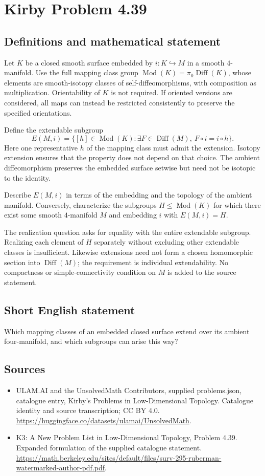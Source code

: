 \documentclass[11pt,a4paper]{article}
\begin{document}
\section*{Kirby Problem 4.39}\label{statement}

\subsection{Definitions and mathematical statement}
Let $K$ be a closed smooth surface embedded by $i:K\hookrightarrow M$
in a smooth $4$-manifold. Use the full mapping class group
$\operatorname{Mod}(K)=\pi_0\operatorname{Diff}(K)$, whose elements
are smooth-isotopy classes of self-diffeomorphisms, with composition
as multiplication. Orientability of $K$ is not required. If oriented
versions are considered, all maps can instead be restricted consistently
to preserve the specified orientations.

Define the extendable subgroup
\[
 E(M,i)=\{[h]\in\operatorname{Mod}(K):
    \exists F\in\operatorname{Diff}(M),\ F\circ i=i\circ h\}.
\]
Here one representative $h$ of the mapping class must admit the
extension. Isotopy extension ensures that the property does not depend
on that choice. The ambient diffeomorphism preserves the embedded
surface setwise but need not be isotopic to the identity.

Describe $E(M,i)$ in terms of the embedding and the topology of the
ambient manifold. Conversely, characterize the subgroups
$H\le\operatorname{Mod}(K)$ for which there exist some smooth
$4$-manifold $M$ and embedding $i$ with $E(M,i)=H$.

The realization question asks for equality with the entire extendable
subgroup. Realizing each element of $H$ separately without excluding
other extendable classes is insufficient. Likewise extensions need
not form a chosen homomorphic section into $\operatorname{Diff}(M)$;
the requirement is individual extendability. No compactness or
simple-connectivity condition on $M$ is added to the source statement.
\subsection{Short English statement}
Which mapping classes of an embedded closed surface extend over its ambient four-manifold, and which subgroups can arise this way?
\subsection{Sources}
\begin{itemize}
\item[S1] ULAM.AI and the UnsolvedMath Contributors, supplied problems.json, catalogue entry, Kirby's Problems in Low-Dimensional Topology. Catalogue identity and source transcription; CC BY 4.0.
\url{https://huggingface.co/datasets/ulamai/UnsolvedMath}.
\item[S2] K3: A New Problem List in Low-Dimensional Topology, Problem 4.39. Expanded formulation of the supplied catalogue statement.
\url{https://math.berkeley.edu/sites/default/files/surv-295-ruberman-watermarked-author-pdf.pdf}.
\end{itemize}
\end{document}
